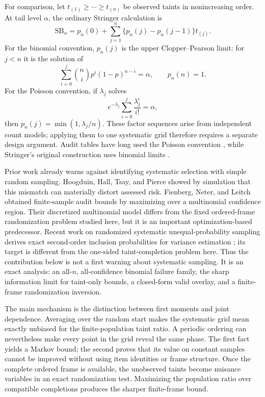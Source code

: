 \documentclass[11pt]{article}
\theoremstyle{definition}
\newcommand{\SB}{\mathrm{SB}}
\begin{document}
For comparison, let $t_{(1)}\ge\cdots\ge t_{(n)}$ be observed taints in
nonincreasing order.  At tail level $\alpha$, the ordinary Stringer
calculation is
\begin{equation}\label{eq:sb}
 \SB_\alpha=p_n(0)+\sum_{j=1}^{n}
       \{p_n(j)-p_n(j-1)\}t_{(j)}.
\end{equation}
For the binomial convention, $p_n(j)$ is the upper Clopper--Pearson limit:
for $j<n$ it is the solution of
\[
 \sum_{i=0}^{j}\binom ni p^i(1-p)^{n-i}=\alpha,
 \qquad p_n(n)=1.
\]
For the Poisson convention, if $\lambda_j$ solves
\[
 e^{-\lambda_j}\sum_{i=0}^{j}\frac{\lambda_j^i}{i!}=\alpha,
\]
then $p_n(j)=\min(1,\lambda_j/n)$.  These factor sequences arise from
independent count models; applying them to one systematic grid therefore
requires a separate design argument.  Audit tables have long used the
Poisson convention \cite{aicpa2012}, while Stringer's original construction
uses binomial limits \cite{stringer1963}.

Prior work already warns against identifying systematic selection with
simple random sampling.  Hoogduin, Hall, Tsay, and Pierce \cite{hoogduin2015}
showed by simulation that this mismatch can materially distort assessed
risk.  Fienberg, Neter, and Leitch \cite{fienberg1977} obtained finite-sample
audit bounds by maximizing over a multinomial confidence region.  Their
discretized multinomial model differs from the fixed ordered-frame
randomization problem studied here, but it is an important
optimization-based predecessor. Recent work on randomized systematic
unequal-probability sampling derives exact second-order inclusion
probabilities for variance estimation \cite{vanberkel2026}; its target is
different from the one-sided taint-completion problem here. Thus the
contribution below is not a first warning about systematic sampling. It is an exact analysis: an
all-$n$, all-confidence binomial failure family, the sharp information limit
for taint-only bounds, a closed-form valid overlay, and a finite-frame
randomization inversion.

The main mechanism is the distinction between first moments and joint
dependence.  Averaging over the random start makes the systematic grid mean
exactly unbiased for the finite-population taint ratio.  A periodic ordering
can nevertheless make every point in the grid reveal the same phase.  The
first fact yields a Markov bound; the second proves that its value on
constant samples cannot be improved without using item identities or frame
structure.  Once the complete ordered frame is available, the unobserved
taints become nuisance variables in an exact randomization test.  Maximizing
the population ratio over compatible completions produces the sharper
finite-frame bound.
\end{document}
